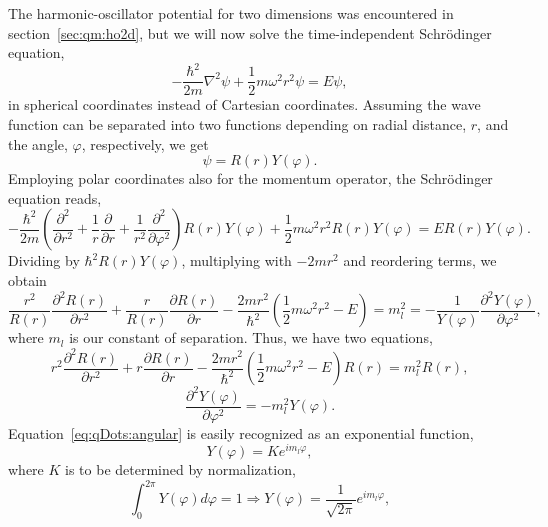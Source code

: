 The harmonic-oscillator potential for two dimensions was encountered in section~\ref{sec:qm:ho2d}, but we will now solve the time-independent Schrödinger equation,
\begin{equation}
-\frac{\hbar^2}{2m}\nabla^2 \psi + \frac{1}{2} m \omega^2 r^2 \psi 
=
E \psi ,
\end{equation}
in spherical coordinates instead of Cartesian coordinates.
Assuming the wave function can be separated into two functions depending on radial distance, $r$, and the angle, $\varphi$, respectively, we get
\begin{equation}
 \psi   = R(r) Y(\varphi).
\end{equation}
Employing polar coordinates also for the momentum operator, the Schrödinger equation reads,
\begin{equation}
-\frac{\hbar^2}{2m} 
\left(\frac{\partial^2}{\partial r^2} + \frac{1}{r}\frac{\partial}{\partial r} + \frac{1}{r^2}\frac{\partial^2}{\partial \varphi^2}\right)
 R(r) Y(\varphi) + \frac{1}{2} m \omega^2 r^2  R(r) Y(\varphi)
=
E  R(r) Y(\varphi) .
\end{equation}
Dividing by $\hbar^2 R(r) Y(\varphi)$, multiplying with $-2 m r^2$ and reordering terms, we obtain
\begin{equation}
\frac{r^2}{R(r)} 
\frac{\partial^2R(r)}{\partial r^2}
+
\frac{r}{R(r)}
\frac{\partial R(r)}{\partial r} 
-
\frac{2mr^2}{\hbar^2}
\left(\frac{1}{2} m \omega^2 r^2 - E  \right)
=
m_l^2
=
-
\frac{1}{Y(\varphi)}
\frac{\partial^2 Y(\varphi)}{\partial \varphi^2},
\end{equation}
where $m_l$ is our constant of separation.
Thus, we have two equations,
\begin{equation}
\label{eq:qDots:radial}
r^2 \frac{\partial^2R(r)}{\partial r^2}
+
r \frac{\partial R(r)}{\partial r} 
-
\frac{2mr^2}{\hbar^2 }
\left(\frac{1}{2} m \omega^2 r^2 - E  \right)R(r)
=
m_l^2 R(r) ,
\end{equation}
\begin{equation}
\label{eq:qDots:angular}
\frac{\partial^2 Y(\varphi)}{\partial \varphi^2}
=
- m_l^2 Y(\varphi) .
\end{equation}
Equation~\eqref{eq:qDots:angular} is easily recognized as an exponential function,
\begin{equation}
Y(\varphi) = Ke^{i m_l \varphi}, 
\end{equation}
where $K$ is to be determined by normalization,
\begin{equation}
\int_0^{2\pi} Y(\varphi) d\varphi = 1 
\Rightarrow 
Y(\varphi) = \frac{1}{\sqrt{2\pi}} e^{im_l \varphi},
\end{equation}
